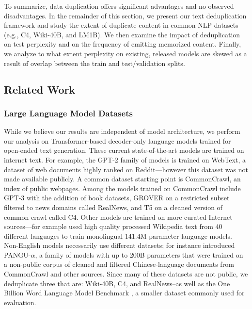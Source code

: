 To summarize, data duplication offers significant advantages and no observed disadvantages.
In the remainder of this section, we present our text deduplication framework and study the extent of duplicate content in common NLP datasets (e.g., C4, Wiki-40B, and LM1B).
We then examine the impact of deduplication on test perplexity and on the frequency of emitting memorized content.
Finally, we analyze to what extent perplexity on existing, released models are skewed as a result of overlap between the train and test/validation splits.

\subsection{Related Work}
\subsubsection{Large Language Model Datasets}
While we believe our results are independent of model architecture,
we perform our analysis on Transformer-based decoder-only language models \citep{vaswani2017attention} trained for open-ended text generation.
These current state-of-the-art models are trained on internet text.
For example, the GPT-2 family of models \citet{radford2019language} is trained on WebText, a dataset of web documents highly ranked on Reddit---however this dataset was not made available publicly.
A common dataset starting point is CommonCrawl, an index of public webpages.
Among the models trained on CommonCrawl include
GPT-3 \cite{brown2020language} with the addition of book datasets,
GROVER \cite{zellers2019defending} on a restricted subset filtered to news domains called RealNews,
and T5 \cite{raffel2019exploring} on a cleaned version of common crawl called C4.
Other models are trained on more curated Internet sources---for example \citet{guo2020wiki40b} used high quality processed Wikipedia text from 40 different languages to train monolingual 141.4M parameter language models.
Non-English models necessarily use different datasets; \citet{zeng2021pangualpha} for instance introduced PANGU-$\alpha$, a family of models with up to 200B parameters that were trained on a non-public corpus of cleaned and filtered Chinese-language documents from CommonCrawl and other sources.
Since many of these datasets are not public,
we deduplicate three that are: Wiki-40B, C4, and RealNews--as well as the One Billion Word Language Model Benchmark \citep{chelba2013one}, 
a smaller
dataset commonly used for evaluation.

